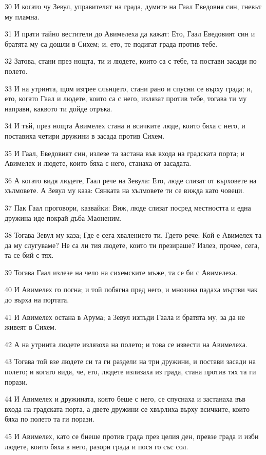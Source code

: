 \par 30 И когато чу Зевул, управителят на града, думите на Гаал Еведовия син, гневът му пламна.
\par 31 И прати тайно вестители до Авимелеха да кажат: Ето, Гаал Еведовият син и братята му са дошли в Сихем; и, ето, те подигат града против тебе.
\par 32 Затова, стани през нощта, ти и людете, които са с тебе, та постави засади по полето.
\par 33 И на утринта, щом изгрее слънцето, стани рано и спусни се върху града; и, ето, когато Гаал и людете, които са с него, излязат против тебе, тогава ти му направи, каквото ти дойде отръка.
\par 34 И тъй, през нощта Авимелех стана и всичките люде, които бяха с него, и поставиха четири дружини в засада против Сихем.
\par 35 И Гаал, Еведовият син, излезе та застана във входа на градската порта; и Авимелех и людете, които бяха с него, станаха от засадата.
\par 36 А когато видя людете, Гаал рече на Зевула: Ето, люде слизат от върховете на хълмовете. А Зевул му каза: Сянката на хълмовете ти се вижда като човеци.
\par 37 Пак Гаал проговори, казвайки: Виж, люде слизат посред местността и една дружина иде покрай дъба Маоненим.
\par 38 Тогава Зевул му каза; Где е сега хвалението ти, Гдето рече: Кой е Авимелех та да му слугуваме? Не са ли тия людете, които ти презираше? Излез, прочее, сега, та се бий с тях.
\par 39 Тогава Гаал излезе на чело на сихемските мъже, та се би с Авимелеха.
\par 40 И Авимелех го погна; и той побягна пред него, и мнозина падаха мъртви чак до върха на портата.
\par 41 И Авимелех остана в Арума; а Зевул изпъди Гаала и братята му, за да не живеят в Сихем.
\par 42 А на утринта людете излязоха на полето; и това се извести на Авимелеха.
\par 43 Тогава той взе людете си та ги раздели на три дружини, и постави засади на полето; и когато видя, че, ето, людете излизаха из града, стана против тях та ги порази.
\par 44 И Авимелех и дружината, която беше с него, се спуснаха и застанаха във входа на градската порта, а двете дружини се хвърлиха върху всичките, които бяха по полето та ги порази.
\par 45 И Авимелех, като се биеше против града през целия ден, превзе града и изби людете, които бяха в него, разори града и пося го със сол.
